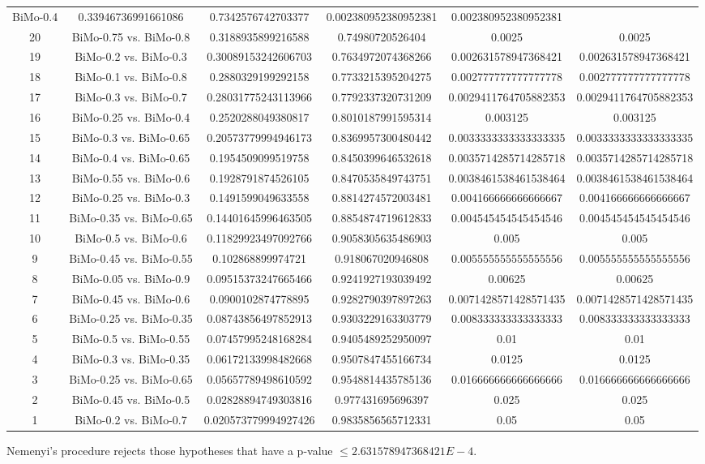 \documentclass[a4paper,10pt]{article}
\begin{document}
\begin{landscape}
\begin{table}[!htp]
\begin{tabular}{cccccc}
BiMo-0.4&0.33946736991661086&0.7342576742703377&0.002380952380952381&0.002380952380952381\\20&BiMo-0.75 vs. BiMo-0.8&0.3188935899216588&0.74980720526404&0.0025&0.0025\\19&BiMo-0.2 vs. BiMo-0.3&0.30089153242606703&0.7634972074368266&0.002631578947368421&0.002631578947368421\\18&BiMo-0.1 vs. BiMo-0.8&0.2880329199292158&0.7733215395204275&0.002777777777777778&0.002777777777777778\\17&BiMo-0.3 vs. BiMo-0.7&0.28031775243113966&0.7792337320731209&0.0029411764705882353&0.0029411764705882353\\16&BiMo-0.25 vs. BiMo-0.4&0.2520288049380817&0.8010187991595314&0.003125&0.003125\\15&BiMo-0.3 vs. BiMo-0.65&0.20573779994946173&0.8369957300480442&0.0033333333333333335&0.0033333333333333335\\14&BiMo-0.4 vs. BiMo-0.65&0.1954509099519758&0.8450399646532618&0.0035714285714285718&0.0035714285714285718\\13&BiMo-0.55 vs. BiMo-0.6&0.1928791874526105&0.8470535849743751&0.0038461538461538464&0.0038461538461538464\\12&BiMo-0.25 vs. BiMo-0.3&0.1491599049633558&0.8814274572003481&0.004166666666666667&0.004166666666666667\\11&BiMo-0.35 vs. BiMo-0.65&0.14401645996463505&0.8854874719612833&0.004545454545454546&0.004545454545454546\\10&BiMo-0.5 vs. BiMo-0.6&0.11829923497092766&0.9058305635486903&0.005&0.005\\9&BiMo-0.45 vs. BiMo-0.55&0.102868899974721&0.918067020946808&0.005555555555555556&0.005555555555555556\\8&BiMo-0.05 vs. BiMo-0.9&0.09515373247665466&0.9241927193039492&0.00625&0.00625\\7&BiMo-0.45 vs. BiMo-0.6&0.0900102874778895&0.9282790397897263&0.0071428571428571435&0.0071428571428571435\\6&BiMo-0.25 vs. BiMo-0.35&0.08743856497852913&0.9303229163303779&0.008333333333333333&0.008333333333333333\\5&BiMo-0.5 vs. BiMo-0.55&0.07457995248168284&0.9405489252950097&0.01&0.01\\4&BiMo-0.3 vs. BiMo-0.35&0.06172133998482668&0.9507847455166734&0.0125&0.0125\\3&BiMo-0.25 vs. BiMo-0.65&0.05657789498610592&0.9548814435785136&0.016666666666666666&0.016666666666666666\\2&BiMo-0.45 vs. BiMo-0.5&0.02828894749303816&0.977431695696397&0.025&0.025\\1&BiMo-0.2 vs. BiMo-0.7&0.020573779994927426&0.9835856565712331&0.05&0.05\\\hline
\end{tabular}
\end{table}
Nemenyi's procedure rejects those hypotheses that have a p-value $\le2.631578947368421E-4$.



\end{landscape}
\end{document}
